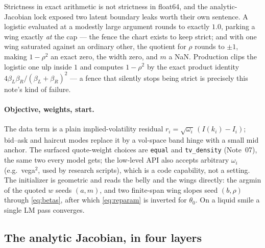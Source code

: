 \documentclass[11pt]{article}
\newcommand{\Iv}{I}                 %
\newcommand{\betL}{\beta_L}
\newcommand{\betR}{\beta_R}
\begin{document}
Strictness in exact arithmetic is not strictness in float64, and the
analytic-Jacobian lock exposed two latent boundary leaks worth their own
sentence.  A logistic evaluated at a modestly large argument rounds to
exactly $1.0$, parking a wing exactly \emph{at} the cap --- the fence the
chart exists to keep strict; and with one wing saturated against an
ordinary other, the quotient for $\rho$ rounds to $\pm1$, making
$1-\rho^2$ an exact zero, the width zero, and $m$ a NaN.  Production clips
the logistic one ulp inside $1$ and computes $1-\rho^2$ by the exact
product identity $4\betL\betR/(\betL+\betR)^2$ --- a fence that silently
stops being strict is precisely this note's kind of failure.

\paragraph{Objective, weights, start.}
The data term is a plain implied-volatility residual
$r_i=\sqrt{\omega_i}\,(\Iv(k_i)-\Iv_i)$; bid--ask and haircut modes replace it
by a vol-space band hinge with a small mid anchor.  The surfaced quote-weight
choices are \texttt{equal} and \texttt{tv\_density} (Note~07), the same two
every model gets; the low-level API also accepts arbitrary $\omega_i$ (e.g.\
vega$^2$, used by research scripts), which is a code capability, not a setting.
The initializer is geometric and reads the belly and the wings directly: the
argmin of the quoted $w$ seeds $(a,m)$, and two finite-span wing slopes seed
$(b,\rho)$ through \eqref{eq:betas}, after which \eqref{eq:reparam} is inverted
for $\theta_0$.  On a liquid smile a single LM pass converges.

\subsection{The analytic Jacobian, in four layers}
\label{sec:jacobian}
\end{document}
